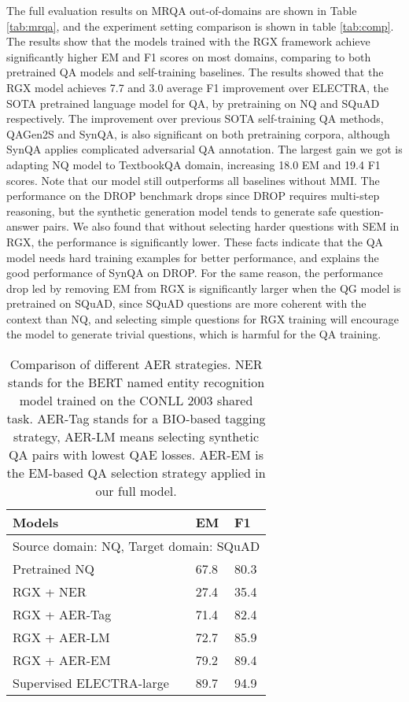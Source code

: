 \documentclass[11pt,a4paper]{article}
\begin{document}
The full evaluation results on MRQA out-of-domains are shown in Table \ref{tab:mrqa}, and the experiment setting comparison is shown in table \ref{tab:comp}. The results show that the models trained with the RGX framework achieve significantly higher EM and F1 scores on most domains, comparing to both pretrained QA models and self-training baselines. The results showed that the RGX model achieves 7.7 and 3.0 average F1 improvement over ELECTRA, the SOTA pretrained language model for QA, by pretraining on NQ and SQuAD respectively. The improvement over previous SOTA self-training QA methods, QAGen2S and SynQA, is also significant on both pretraining corpora, although SynQA applies complicated adversarial QA annotation. The largest gain we got is adapting NQ model to TextbookQA domain, increasing 18.0 EM and 19.4 F1 scores. Note that our model still outperforms all baselines without MMI. The performance on the DROP benchmark drops since DROP requires multi-step reasoning, but the synthetic generation model tends to generate safe question-answer pairs. We also found that without selecting harder questions with SEM in RGX, the performance is significantly lower. These facts indicate that the QA model needs hard training examples for better performance, and explains the good performance of SynQA on DROP. For the same reason, the performance drop led by removing EM from RGX is significantly larger when the QG model is pretrained on SQuAD, since SQuAD questions are more coherent with the context than NQ, and selecting simple questions for RGX training will encourage the model to generate trivial questions, which is harmful for the QA training.



\begin{table}[t]
\small
\centering
\begin{tabular}{@{}lll@{}}
\toprule
\textbf{Models}             & \textbf{EM}   & \textbf{F1}   \\ \midrule
\multicolumn{3}{c}{Source domain: NQ, Target domain: SQuAD}      \\ \hdashline[1.5pt/2pt]
Pretrained NQ & 67.8 & 80.3 \\
RGX + NER  & 27.4 & 35.4 \\
RGX + AER-Tag  & 71.4 & 82.4 \\
RGX + AER-LM  & 72.7 & 85.9 \\
RGX + AER-EM  & 79.2 & 89.4 \\
Supervised ELECTRA-large      & 89.7 & 94.9 \\ \bottomrule
\end{tabular}
\caption{Comparison of different AER strategies. NER stands for the BERT named entity recognition model trained on the CONLL 2003 shared task. AER-Tag stands for a BIO-based tagging strategy, AER-LM means selecting synthetic QA pairs with lowest QAE losses. AER-EM is the EM-based QA selection strategy applied in our full model.}
\label{tab:nq-sq}
\end{table}
\end{document}
